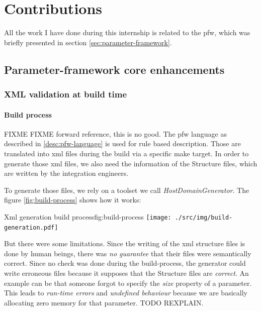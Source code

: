 \chapter{Contributions}\label{chap:contributions}

All the work I have done during this internship is related to the \gls{pfw},
which was briefly presented in section \ref{sec:parameter-framework}.


\section{Parameter-framework core enhancements}

\subsection{XML validation at build time}
\subsubsection{Build process}
FIXME FIXME forward reference, this is no good.
The pfw language as described in \ref{desc:pfw-language} is used for rule based
description. Those are translated into \gls{xml} files during the build via a
specific make target.  In order to generate those \gls{xml} files, we also need
the information of the Structure files, which are written by the integration
engineers.

To generate those files, we rely on a toolset we call \emph{HostDomainGenerator}.
The figure \ref{fig:build-process} shows how it works:

\begin{figureGraphics}{Xml generation build process}{fig:build-process}
    \texttt{[image: ./src/img/build-generation.pdf]}
\end{figureGraphics}

But there were some limitations. Since the writing of the \gls{xml} structure files is done by human beings, there was
\emph{no guarantee} that their files were semantically correct.
Since no check was done during the build-process, the generator could write erroneous files because it supposes that
the Structure files are \emph{correct}. An example can be that someone forgot to specify the \emph{size} property of a parameter.
This leads to \emph{run-time errors} and \emph{undefined behaviour} because we are basically allocating zero memory for that parameter.
TODO REXPLAIN.

